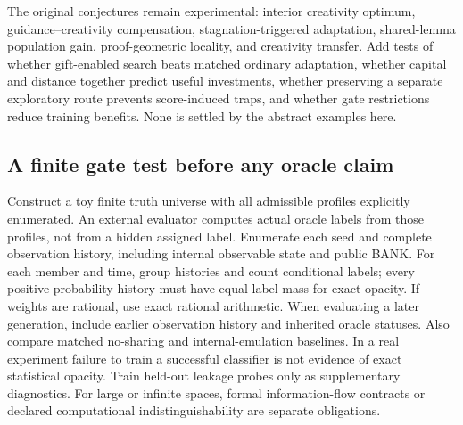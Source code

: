 \documentclass[11pt]{article}
\theoremstyle{definition}\newtheorem{definition}[theorem]{Definition}\newtheorem{conjecture}[theorem]{Conjecture}\newtheorem{example}[theorem]{Example}
\begin{document}
The original conjectures remain experimental: interior creativity optimum, guidance--creativity compensation, stagnation-triggered adaptation, shared-lemma population gain, proof-geometric locality, and creativity transfer. Add tests of whether gift-enabled search beats matched ordinary adaptation, whether capital and distance together predict useful investments, whether preserving a separate exploratory route prevents score-induced traps, and whether gate restrictions reduce training benefits. None is settled by the abstract examples here.

\subsection{A finite gate test before any oracle claim}
Construct a toy finite truth universe with all admissible profiles explicitly enumerated. An external evaluator computes actual oracle labels from those profiles, not from a hidden assigned label. Enumerate each seed and complete observation history, including internal observable state and public BANK. For each member and time, group histories and count conditional labels; every positive-probability history must have equal label mass for exact opacity. If weights are rational, use exact rational arithmetic. When evaluating a later generation, include earlier observation history and inherited oracle statuses. Also compare matched no-sharing and internal-emulation baselines. In a real experiment failure to train a successful classifier is not evidence of exact statistical opacity. Train held-out leakage probes only as supplementary diagnostics. For large or infinite spaces, formal information-flow contracts or declared computational indistinguishability are separate obligations.
\end{document}
